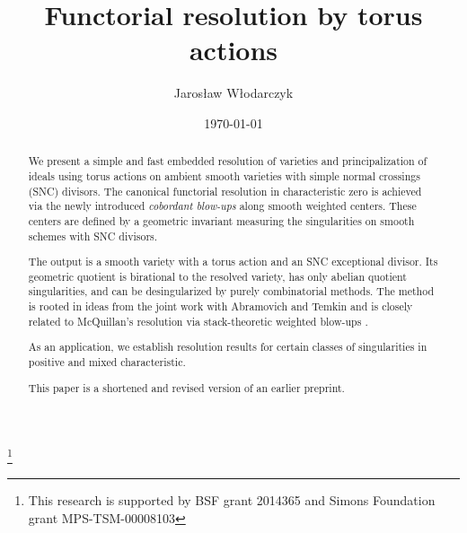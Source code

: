 \documentclass{amsart}
\begin{document}
\title{Functorial resolution by torus actions}


%

\author[J. W{\l}odarczyk] {Jaros{\l}aw W{\l}odarczyk}
\address{Department of Mathematics, Purdue University\\
150 N. University Street,\\ West Lafayette, IN 47907-2067}

\thanks{This research is supported by  BSF grant 2014365 and Simons Foundation grant  MPS-TSM-00008103} %


\date{\today}

%

\begin{abstract}
We present a simple and fast embedded resolution of varieties and principalization of ideals using torus actions on ambient smooth varieties with simple normal crossings (SNC) divisors. The canonical functorial resolution in characteristic zero is achieved via the newly introduced \emph{cobordant blow-ups} along smooth weighted centers. These centers are defined by a geometric invariant measuring the singularities on smooth schemes with SNC divisors.

The output is a smooth variety with a torus action and an SNC exceptional divisor. Its geometric quotient is birational to the resolved variety, has only abelian quotient singularities, and can be desingularized by purely combinatorial methods. The method is rooted in ideas from the joint work with Abramovich and Temkin \cite{ATW-weighted} and is closely related to McQuillan's resolution via stack-theoretic weighted blow-ups \cite{Marzo-McQuillan}.

As an application, we establish resolution results for certain classes of singularities in positive and mixed characteristic.

This paper is a shortened and revised version of an earlier preprint.
\end{abstract}
\maketitle
\setcounter{tocdepth}{1}
\setcounter{tocdepth}{2}
\tableofcontents
\end{document}
